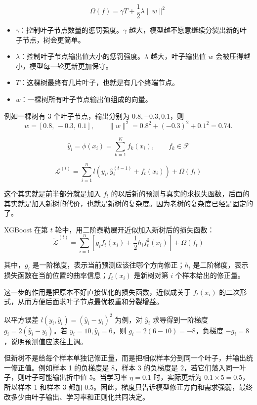 \begin{note}[正则项]
\[
\Omega(f)=\gamma T+\frac{1}{2}\lambda \|w\|^2
\]

\begin{itemize}
    \item $\gamma$：控制叶子节点数量的惩罚强度。$\gamma$ 越大，模型越不愿意继续分裂出新的叶子节点，树会更简单。
    \item $\lambda$：控制叶子节点输出值大小的惩罚强度。$\lambda$ 越大，叶子输出值 $w$ 会被压得越小，模型每一轮更新更加保守。
    \item $T$：这棵树最终有几片叶子，也就是有几个终端节点。
    \item $w$：一棵树所有叶子节点输出值组成的向量。
\end{itemize}

例如一棵树有 3 个叶子节点，输出分别为 $0.8,-0.3,0.1$，则
\[
w=[0.8,\,-0.3,\,0.1],
\qquad
\|w\|^2
=
0.8^2+(-0.3)^2+0.1^2
=
0.74.
\]
\end{note}
\begin{note}
    \[
\hat{y}_i
=
\phi(x_i)
=
\sum_{k=1}^{K} f_k(x_i),
\qquad
f_k \in \mathcal{F}
\]
\end{note}
\begin{note}[加入第t课树的优化函数。]
\[
\mathcal{L}^{(t)}
=
\sum_{i=1}^{n}
l\left(y_i,\hat{y}_i^{(t-1)}+f_t(x_i)\right)
+
\Omega(f_t)
\]

这个其实就是前半部分就是加入 $f_t$ 的以后新的预测与真实的求损失函数，后面的其实就是加入新树的代价，也就是新树的复杂度。因为老树的复杂度已经是固定的了。
\end{note}
\begin{note}
XGBoost 在第 $t$ 轮中，用二阶泰勒展开近似加入新树后的损失函数：
\[
\tilde{\mathcal{L}}^{(t)}
=
\sum_{i=1}^{n}
\left[
g_i f_t(x_i)
+
\frac{1}{2}h_i f_t^2(x_i)
\right]
+
\Omega(f_t)
\]

其中，$g_i$ 是一阶梯度，表示当前预测应该往哪个方向修正；$h_i$ 是二阶梯度，表示损失函数在当前位置的曲率信息；$f_t(x_i)$ 是新树对第 $i$ 个样本给出的修正量。

这一步的作用是把原本不好直接优化的损失函数，近似成关于 $f_t(x_i)$ 的二次形式，从而方便后面求叶子节点最优权重和分裂增益。
\end{note}
\begin{example}[梯度如何影响计算]
以平方误差 $l(y_i,\hat{y}_i)=(\hat{y}_i-y_i)^2$ 为例，对 $\hat{y}_i$ 求导得到一阶梯度 $g_i=2(\hat{y}_i-y_i)$。若 $y_i=10,\hat{y}_i=6$，则 $g_i=2(6-10)=-8$，负梯度 $-g_i=8$，说明预测值应该往上调。

但新树不是给每个样本单独记修正量，而是把相似样本分到同一个叶子，并输出统一修正值。例如样本 1 的负梯度是 $8$，样本 3 的负梯度是 $2$，若它们落入同一叶子，则叶子可能输出折中值 $5$。当学习率 $\eta=0.1$ 时，实际更新为 $0.1\times 5=0.5$，所以样本 1 和样本 3 都加 $0.5$。因此，梯度只告诉模型修正方向和需求强弱，最终改多少由叶子输出、学习率和正则化共同决定。
\end{example}
